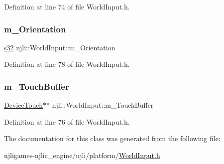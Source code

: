 Definition at line 74 of file World\+Input.\+h.

\mbox{\label{classnjli_1_1_world_input_ae4e2eea7b14113c53cab85a63d44b985}} 
\subsubsection{\texorpdfstring{m\+\_\+\+Orientation}{m\_Orientation}}
{\footnotesize\ttfamily \mbox{\hyperlink{_util_8h_aa62c75d314a0d1f37f79c4b73b2292e2}{s32}} njli\+::\+World\+Input\+::m\+\_\+\+Orientation\hspace{0.3cm}{\ttfamily [private]}}



Definition at line 78 of file World\+Input.\+h.

\mbox{\label{classnjli_1_1_world_input_a51dd3d566354398abd60c94fa040e208}} 
\subsubsection{\texorpdfstring{m\+\_\+\+Touch\+Buffer}{m\_TouchBuffer}}
{\footnotesize\ttfamily \mbox{\hyperlink{classnjli_1_1_device_touch}{Device\+Touch}}$\ast$$\ast$ njli\+::\+World\+Input\+::m\+\_\+\+Touch\+Buffer\hspace{0.3cm}{\ttfamily [private]}}



Definition at line 76 of file World\+Input.\+h.



The documentation for this class was generated from the following file\+:\begin{DoxyCompactItemize}
\item 
njligames-\/njlic\+\_\+engine/njli/platform/\mbox{\hyperlink{_world_input_8h}{World\+Input.\+h}}\end{DoxyCompactItemize}
